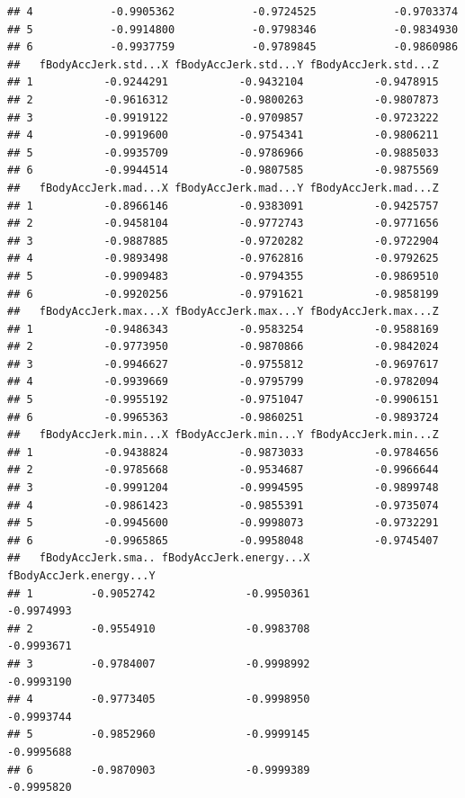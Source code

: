 \documentclass[
]{article}
\begin{document}
\begin{verbatim}
## 4            -0.9905362            -0.9724525            -0.9703374
## 5            -0.9914800            -0.9798346            -0.9834930
## 6            -0.9937759            -0.9789845            -0.9860986
##   fBodyAccJerk.std...X fBodyAccJerk.std...Y fBodyAccJerk.std...Z
## 1           -0.9244291           -0.9432104           -0.9478915
## 2           -0.9616312           -0.9800263           -0.9807873
## 3           -0.9919122           -0.9709857           -0.9723222
## 4           -0.9919600           -0.9754341           -0.9806211
## 5           -0.9935709           -0.9786966           -0.9885033
## 6           -0.9944514           -0.9807585           -0.9875569
##   fBodyAccJerk.mad...X fBodyAccJerk.mad...Y fBodyAccJerk.mad...Z
## 1           -0.8966146           -0.9383091           -0.9425757
## 2           -0.9458104           -0.9772743           -0.9771656
## 3           -0.9887885           -0.9720282           -0.9722904
## 4           -0.9893498           -0.9762816           -0.9792625
## 5           -0.9909483           -0.9794355           -0.9869510
## 6           -0.9920256           -0.9791621           -0.9858199
##   fBodyAccJerk.max...X fBodyAccJerk.max...Y fBodyAccJerk.max...Z
## 1           -0.9486343           -0.9583254           -0.9588169
## 2           -0.9773950           -0.9870866           -0.9842024
## 3           -0.9946627           -0.9755812           -0.9697617
## 4           -0.9939669           -0.9795799           -0.9782094
## 5           -0.9955192           -0.9751047           -0.9906151
## 6           -0.9965363           -0.9860251           -0.9893724
##   fBodyAccJerk.min...X fBodyAccJerk.min...Y fBodyAccJerk.min...Z
## 1           -0.9438824           -0.9873033           -0.9784656
## 2           -0.9785668           -0.9534687           -0.9966644
## 3           -0.9991204           -0.9994595           -0.9899748
## 4           -0.9861423           -0.9855391           -0.9735074
## 5           -0.9945600           -0.9998073           -0.9732291
## 6           -0.9965865           -0.9958048           -0.9745407
##   fBodyAccJerk.sma.. fBodyAccJerk.energy...X fBodyAccJerk.energy...Y
## 1         -0.9052742              -0.9950361              -0.9974993
## 2         -0.9554910              -0.9983708              -0.9993671
## 3         -0.9784007              -0.9998992              -0.9993190
## 4         -0.9773405              -0.9998950              -0.9993744
## 5         -0.9852960              -0.9999145              -0.9995688
## 6         -0.9870903              -0.9999389              -0.9995820

\end{verbatim}
\end{document}
